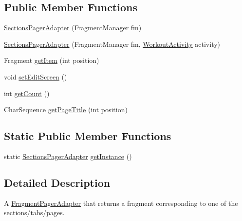 \subsection*{Public Member Functions}
\begin{DoxyCompactItemize}
\item 
\hyperlink{classcom_1_1example_1_1workoutcompanion_1_1_sections_pager_adapter_a9d55b35c8efb57dd57494b5e4cc478e2}{Sections\-Pager\-Adapter} (Fragment\-Manager fm)
\item 
\hyperlink{classcom_1_1example_1_1workoutcompanion_1_1_sections_pager_adapter_ac27eda60d4dce67d5dd1bb89002944a4}{Sections\-Pager\-Adapter} (Fragment\-Manager fm, \hyperlink{classcom_1_1example_1_1workoutcompanion_1_1_workout_activity}{Workout\-Activity} activity)
\item 
Fragment \hyperlink{classcom_1_1example_1_1workoutcompanion_1_1_sections_pager_adapter_a5aef865652aa278bcc09dc0536b885be}{get\-Item} (int position)
\item 
void \hyperlink{classcom_1_1example_1_1workoutcompanion_1_1_sections_pager_adapter_a40a7e9f7ea927f41f6ee757cad2552d4}{set\-Edit\-Screen} ()
\item 
int \hyperlink{classcom_1_1example_1_1workoutcompanion_1_1_sections_pager_adapter_abd1ea63ea9dfa79c504e02fe21c3740b}{get\-Count} ()
\item 
Char\-Sequence \hyperlink{classcom_1_1example_1_1workoutcompanion_1_1_sections_pager_adapter_a989c3511742a8884a105318c3dafb463}{get\-Page\-Title} (int position)
\end{DoxyCompactItemize}
\subsection*{Static Public Member Functions}
\begin{DoxyCompactItemize}
\item 
static \hyperlink{classcom_1_1example_1_1workoutcompanion_1_1_sections_pager_adapter}{Sections\-Pager\-Adapter} \hyperlink{classcom_1_1example_1_1workoutcompanion_1_1_sections_pager_adapter_a613c6632c73f4a0aade49aeba223ec84}{get\-Instance} ()
\end{DoxyCompactItemize}


\subsection{Detailed Description}
A \hyperlink{}{Fragment\-Pager\-Adapter} that returns a fragment corresponding to one of the sections/tabs/pages. 

